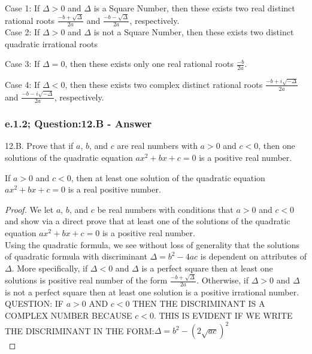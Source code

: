 Case 1: If $\Delta > 0$ and $\Delta $ is a Square Number, then these exists two real distinct rational roots $\frac{-b + \sqrt{\Delta}}{2a}$ and $\frac{-b - \sqrt{\Delta}}{2a}$, respectively. \\

Case 2: If $\Delta > 0$ and $\Delta $ is not a Square Number, then these exists two distinct quadratic irrational roots


Case 3: If $\Delta = 0$, then these exists only one real rational roots $\frac{-b}{2a}$. 


Case 4: If $\Delta < 0$, then these exists two complex distinct rational roots $\frac{-b + i\sqrt{- \Delta}}{2a}$ and $\frac{-b - i\sqrt{- \Delta}}{2a}$, respectively. \\


\newpage
\subsubsection*{e.1.2; Question:12.B - Answer}
12.B. Prove that if $a$, $b$, and $c$ are real numbers with $a>0$ and $c<0$, then one solutions of the quadratic equation $ax^2 + bx + c = 0$ is a positive real number. \\


\begin{tcolorbox}
	\begin{theorem}
		If $a>0$ and $c<0$, then at least one solution of the quadratic equation $ax^2 + bx + c = 0$ is a real positive number.
	\end{theorem}
\end{tcolorbox}

\begin{proof}
We let $a$, $b$, and $c$ be real numbers with conditions that $a>0$ and $c<0$ and show via a  direct prove that at least one of the solutions of the quadratic equation $ax^2 + bx + c = 0$ is a positive real number. \\
Using the quadratic formula, we see without loss of generality that the solutions of quadratic formula with discriminant $\Delta = b^2 - 4ac$ is dependent on attributes of $\Delta$. More  specifically, if $\Delta <0$ and $\Delta$ is a perfect square then at least one solutions is positive real number of the form  $\frac{-b + \sqrt{\Delta}}{2a}$. Otherwise, if $\Delta > 0$ and $\Delta$ is not a perfect square then at least one solution is a positive irrational number. \\
QUESTION: IF $a>0$ AND $c<0$ THEN THE DISCRIMINANT IS A COMPLEX NUMBER BECAUSE $c<0$. THIS IS EVIDENT IF WE WRITE THE  DISCRIMINANT IN THE FORM:$\Delta = b^2 - (2 \sqrt{ac})^2$ \\

\end{proof}













